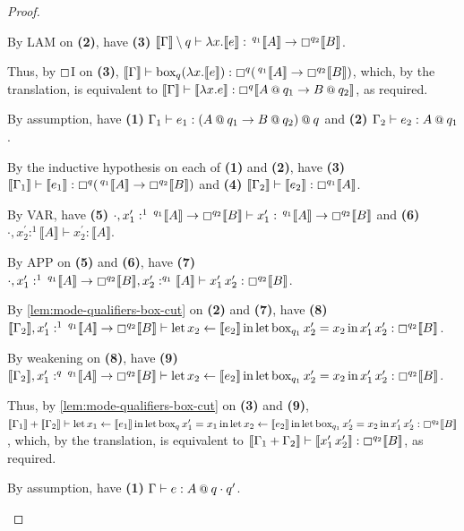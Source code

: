 \documentclass[acmsmall,screen,nonacm]{acmart}
\makeatletter
\DeclareMathOperator{\llet}{\text{let}}
\DeclareMathOperator{\lin}{\text{in}}
\DeclareMathOperator{\bbox}{\text{box}}
\newcommand{\at}{\mathbin{\mbox{\small\ensuremath{@}}}}
\newcommand{\tee}{\vdash}
\newcommand{\sem}[1]{\llbracket #1 \rrbracket}
\makeatother
\begin{document}
\begin{proof}
\begin{description}
    By LAM on \textbf{(2)}, have \textbf{(3)} $\sem{\Gamma} \setminus q \tee \lambda x.\sem{e} : \,^{q_1} \sem{A} \rightarrow \boxempty^{q_2} \sem{B}$.
    
    Thus, by $\boxempty$I on \textbf{(3)}, $\sem{\Gamma} \tee \bbox_q (\lambda x.\sem{e}) : \boxempty^q (\,^{q_1} \sem{A} \rightarrow \boxempty^{q_2} \sem{B})$, which, by the translation, is equivalent to $\sem{\Gamma} \tee \sem{\lambda x.e} : \boxempty^q \sem{A \at q_1 \rightarrow B \at q_2}$, as required.
    \\
    \item[Case APP.]
    By assumption, have \textbf{(1)} $\Gamma_1 \tee e_1 : (A \at q_1 \rightarrow B \at q_2) \at q$ and \textbf{(2)} $\Gamma_2 \tee e_2 : A \at q_1$.

    By the inductive hypothesis on each of \textbf{(1)} and \textbf{(2)}, have \textbf{(3)} $\sem{\Gamma_1} \tee \sem{e_1} : \boxempty^q (\,^{q_1} \sem{A} \rightarrow \boxempty^{q_2} \sem{B})$ and \textbf{(4)} $\sem{\Gamma_2} \tee \sem{e_2} : \boxempty^{q_1} \sem{A}$.

    By VAR, have \textbf{(5)} $\cdot, x_1^\prime :^1 \,^{q_1} \sem{A} \rightarrow \boxempty^{q_2} \sem{B} \tee x_1^\prime : \,^{q_1} \sem{A} \rightarrow \boxempty^{q_2} \sem{B}$ and \textbf{(6)} $\cdot, x_2^\prime :^1 \sem{A} \tee x_2^\prime : \sem{A}$.

    By APP on \textbf{(5)} and \textbf{(6)}, have \textbf{(7)} $\cdot, x_1^\prime :^1 \,^{q_1} \sem{A} \rightarrow \boxempty^{q_2} \sem{B}, x_2^\prime :^{q_1} \sem{A} \tee x_1^\prime \, x_2^\prime : \boxempty^{q_2} \sem{B}$.

    By \ref{lem:mode-qualifiers-box-cut} on \textbf{(2)} and \textbf{(7)}, have \textbf{(8)} $\sem{\Gamma_2}, x_1^\prime :^1 \,^{q_1} \sem{A} \rightarrow \boxempty^{q_2} \sem{B} \tee \llet x_2 \leftarrow \sem{e_2} \lin \llet \bbox_{q_1} x_2^\prime = x_2 \lin x_1^\prime \, x_2^\prime : \boxempty^{q_2} \sem{B}$.
    
    By weakening on \textbf{(8)}, have \textbf{(9)} $\sem{\Gamma_2}, x_1^\prime :^q \,^{q_1} \sem{A} \rightarrow \boxempty^{q_2} \sem{B} \tee \llet x_2 \leftarrow \sem{e_2} \lin \llet \bbox_{q_1} x_2^\prime = x_2 \lin x_1^\prime \, x_2^\prime : \boxempty^{q_2} \sem{B}$.
    
    Thus, by \ref{lem:mode-qualifiers-box-cut} on \textbf{(3)} and \textbf{(9)}, $\sem{\Gamma_1} + \sem{\Gamma_2} \tee \llet x_1 \leftarrow \sem{e_1} \lin \llet \bbox_q x_1^\prime = x_1 \lin \llet x_2 \leftarrow \sem{e_2} \lin \llet \bbox_{q_1} x_2^\prime = x_2 \lin x_1^\prime \, x_2^\prime : \boxempty^{q_2} \sem{B}$, which, by the translation, is equivalent to $\sem{\Gamma_1 + \Gamma_2} \tee \sem{x_1^\prime \, x_2^\prime} : \boxempty^{q_2} \sem{B}$, as required.
    \\
    \item[Case $\boxempty$I.]
    By assumption, have \textbf{(1)} $\Gamma \tee e : A \at q \cdot q^\prime$.
    

\end{description}
\end{proof}
\end{document}
